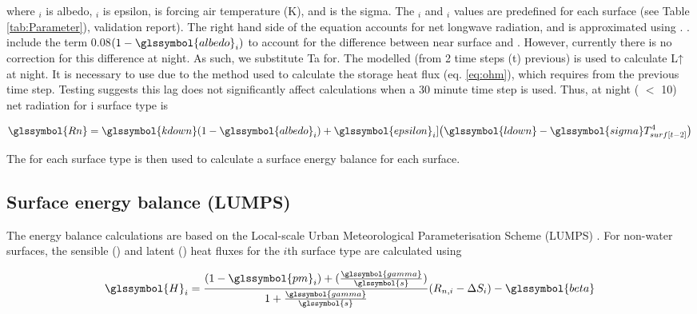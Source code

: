 \documentclass[final,3p,times,authoryear]{elsarticle}
\begin{document}

where $_{i}$ is \glsdesc{albedo}, $_{i}$ is \glsdesc{epsilon},  is forcing air temperature (K), and  is the \glsdesc{sigma}. The $_{i}$ and $_{i}$ values are predefined for each surface (see Table \ref{tab:Parameter}), validation report).  The right hand side of the equation accounts for net longwave radiation, and  is approximated using . \cite{Loridan2011}. include the term 0.08$(1-\glssymbol{albedo}_{i})$ to account for the difference between near surface  and . However, currently there is no correction for this difference at night. As such, we substitute Ta for. The modelled  (from 2 time steps (t) previous) is used to calculate L↑ at night. It is necessary to use  due to the method used to calculate the storage heat flux (eq. \ref{eq:ohm}), which requires  from the previous time step.  Testing suggests this lag does not significantly affect calculations when a 30 minute time step is used. Thus, at night ( $<$ 10) net radiation for i surface type is

\begin{equation} 
\glssymbol{Rn}  
 = \glssymbol{kdown} 
 (1-\glssymbol{albedo}_{i}) + \glssymbol{epsilon}_{i}] \big(\glssymbol{ldown}-\glssymbol{sigma} T_{surf[t-2]}^{4} \big) 
\label{eq:rn2} \end{equation} 


The  for each surface type is then used to calculate a surface energy balance for each surface. 
\subsection{Surface energy balance (LUMPS)}\label{sec:lumps}

The energy balance calculations are based on the Local-scale Urban Meteorological Parameterisation Scheme (LUMPS) \citep{Grimmond2002a}. For non-water surfaces, the sensible () and latent () heat fluxes for the $i$th surface type are calculated using


\begin{equation} 
\glssymbol{H}_{i} = 
\frac{(1-\glssymbol{pm}_{i})+(\frac{\glssymbol{gamma}}{\glssymbol{s}})}{1+\frac{\glssymbol{gamma}}{\glssymbol{s}}}
(R_{n,i} -\Delta S_{i})- \glssymbol{beta}
\label{eq:Hi} \end{equation} 
\end{document}
